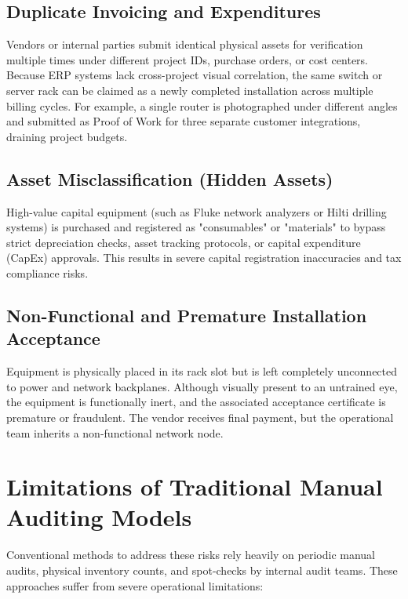 \documentclass[11pt,letterpaper]{report}
\begin{document}
\subsection{Duplicate Invoicing and Expenditures}
Vendors or internal parties submit identical physical assets for verification multiple times under different project IDs, purchase orders, or cost centers. Because ERP systems lack cross-project visual correlation, the same switch or server rack can be claimed as a newly completed installation across multiple billing cycles. For example, a single router is photographed under different angles and submitted as Proof of Work for three separate customer integrations, draining project budgets.

\subsection{Asset Misclassification (Hidden Assets)}
High-value capital equipment (such as Fluke network analyzers or Hilti drilling systems) is purchased and registered as "consumables" or "materials" to bypass strict depreciation checks, asset tracking protocols, or capital expenditure (CapEx) approvals. This results in severe capital registration inaccuracies and tax compliance risks.

\subsection{Non-Functional and Premature Installation Acceptance}
Equipment is physically placed in its rack slot but is left completely unconnected to power and network backplanes. Although visually present to an untrained eye, the equipment is functionally inert, and the associated acceptance certificate is premature or fraudulent. The vendor receives final payment, but the operational team inherits a non-functional network node.

\section{Limitations of Traditional Manual Auditing Models}

Conventional methods to address these risks rely heavily on periodic manual audits, physical inventory counts, and spot-checks by internal audit teams. These approaches suffer from severe operational limitations:
\end{document}

